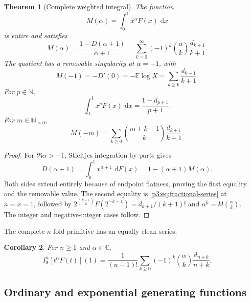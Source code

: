 \documentclass[11pt,oneside]{article}
\newtheorem{theorem}{Theorem}[section]
\newtheorem{corollary}[theorem]{Corollary}
\theoremstyle{definition}
\theoremstyle{remark}
\newcommand{\E}{\mathbb E}
\newcommand{\C}{\mathbb C}
\newcommand{\N}{\mathbb N}
\newcommand{\dd}{\,\mathrm d}
\newcommand{\fall}[2]{#1^{\underline{#2}}}
\newcommand{\1}{\mathbf 1}
\begin{document}
\begin{theorem}[Complete weighted integral]
\label{p3:thm:complete-M}
The function
\begin{equation}
 M(\alpha)=\int_0^1x^\alpha F(x)\,\dd x                       \label{p3:eq:M-def}
\end{equation}
is entire and satisfies
\begin{equation}
 \boxed{
 M(\alpha)=\frac{1-D(\alpha+1)}{\alpha+1}
 =\sum_{k=0}^{\infty}(-1)^k\binom\alpha k\frac{d_{k+1}}{k+1}.}
 \label{p3:eq:M-master}
\end{equation}
The quotient has a removable singularity at $\alpha=-1$, with
\begin{equation}
 M(-1)=-D'(0)=-\E\log X=\sum_{k\ge0}\frac{d_{k+1}}{k+1}.      \label{p3:eq:M-minus-one}
\end{equation}
For $p\in\N$,
\begin{equation}
 \int_0^1x^pF(x)\,\dd x=\frac{1-d_{p+1}}{p+1}.               \label{p3:eq:M-integer}
\end{equation}
For $m\in\N_{>0}$,
\begin{equation}
 M(-m)=\sum_{k\ge0}\binom{m+k-1}{k}\frac{d_{k+1}}{k+1}.      \label{p3:eq:M-negative}
\end{equation}
\end{theorem}

\begin{proof}
For $\Re\alpha>-1$, Stieltjes integration by parts gives
\[
 D(\alpha+1)=\int_0^1x^{\alpha+1}\,\dd F(x)
 =1-(\alpha+1)M(\alpha).
\]
Both sides extend entirely because of endpoint flatness, proving the first equality and the
removable value.  The second equality is \eqref{p3:eq:fractional-series} at $n=x=1$, followed by
$2^{\binom{k+1}{2}}F(2^{-k-1})=d_{k+1}/(k+1)!$ and
$\fall\alpha k=k!\binom\alpha k$.  The integer and negative-integer cases follow.
\end{proof}

The complete $n$-fold primitive has an equally clean series.

\begin{corollary}
For $n\ge1$ and $\alpha\in\C$,
\begin{equation}
 \boxed{
 I_0^n[t^\alpha F(t)](1)
 =\frac1{(n-1)!}\sum_{k\ge0}(-1)^k\binom\alpha k
 \frac{d_{n+k}}{n+k}.}
 \label{p3:eq:complete-nfold}
\end{equation}
\end{corollary}

\subsection{Ordinary and exponential generating functions}
\end{document}
